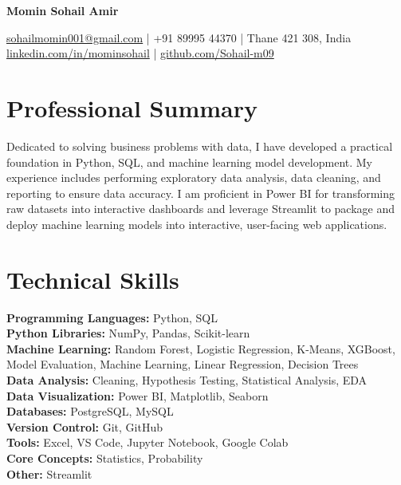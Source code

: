 \documentclass[10pt,a4paper]{article}
\begin{document}

\begin{center}

{\LARGE \textbf{Momin Sohail Amir}}

\vspace{4pt}

\href{mailto:sohailmomin001@gmail.com}{sohailmomin001@gmail.com} \quad | \quad +91 89995 44370 \quad | \quad Thane 421 308, India \\ \href{https://linkedin.com/in/mominsohail}{linkedin.com/in/mominsohail} \quad | \quad \href{https://github.com/Sohail-m09}{github.com/Sohail-m09}

\end{center}

\section*{Professional Summary}

Dedicated to solving business problems with data, I have developed a practical foundation in Python, SQL, and machine learning model development. My experience includes performing exploratory data analysis, data cleaning, and reporting to ensure data accuracy. I am proficient in Power BI for transforming raw datasets into interactive dashboards and leverage Streamlit to package and deploy machine learning models into interactive, user-facing web applications.

\section*{Technical Skills}

\textbf{Programming Languages:} Python, SQL\\
\textbf{Python Libraries:} NumPy, Pandas, Scikit-learn\\
\textbf{Machine Learning:} Random Forest, Logistic Regression, K-Means, XGBoost, Model Evaluation, Machine Learning, Linear Regression, Decision Trees\\
\textbf{Data Analysis:} Cleaning, Hypothesis Testing, Statistical Analysis, EDA\\
\textbf{Data Visualization:} Power BI, Matplotlib, Seaborn\\
\textbf{Databases:} PostgreSQL, MySQL\\
\textbf{Version Control:} Git, GitHub\\
\textbf{Tools:} Excel, VS Code, Jupyter Notebook, Google Colab\\
\textbf{Core Concepts:} Statistics, Probability\\
\textbf{Other:} Streamlit
\end{document}
